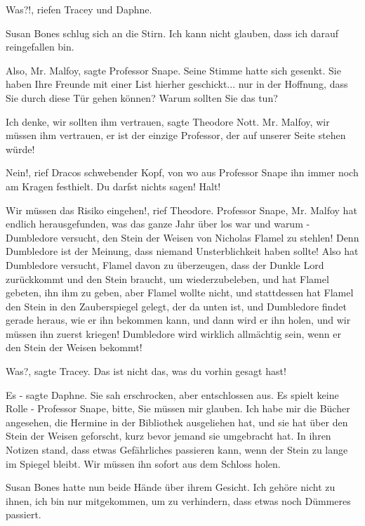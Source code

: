 \glqq{}Was?!\grqq{}, riefen Tracey und Daphne.

Susan Bones schlug sich an die Stirn. \glqq{}Ich kann nicht glauben, dass ich
darauf reingefallen bin.\grqq{}

\glqq{}Also, Mr. Malfoy\grqq{}, sagte Professor Snape. Seine Stimme hatte sich
gesenkt. \glqq{}Sie haben Ihre Freunde mit einer List hierher geschickt... nur in
der Hoffnung, dass Sie durch diese Tür gehen können? Warum sollten Sie das tun?\grqq{}

\glqq{}Ich denke, wir sollten ihm vertrauen\grqq{}, sagte Theodore Nott. \glqq{}
Mr. Malfoy, wir müssen ihm vertrauen, er ist der einzige Professor, der auf
unserer Seite stehen würde!\grqq{}

\glqq{}Nein!\grqq{}, rief Dracos schwebender Kopf, von wo aus Professor Snape ihn
immer noch am Kragen festhielt. \glqq{}Du darfst nichts sagen! Halt!\grqq{}

\glqq{}Wir müssen das Risiko eingehen!\grqq{}, rief Theodore. \glqq{}Professor
Snape, Mr. Malfoy hat endlich herausgefunden, was das ganze Jahr über los war
und warum - Dumbledore versucht, den Stein der Weisen von Nicholas Flamel zu
stehlen! Denn Dumbledore ist der Meinung, dass niemand Unsterblichkeit haben
sollte! Also hat Dumbledore versucht, Flamel davon zu überzeugen, dass der
Dunkle Lord zurückkommt und den Stein braucht, um wiederzubeleben, und hat
Flamel gebeten, ihn ihm zu geben, aber Flamel wollte nicht, und stattdessen hat
Flamel den Stein in den Zauberspiegel gelegt, der da unten ist, und Dumbledore
findet gerade heraus, wie er ihn bekommen kann, und dann wird er ihn holen, und
wir müssen ihn zuerst kriegen! Dumbledore wird wirklich allmächtig sein, wenn er
den Stein der Weisen bekommt!\grqq{}

\glqq{}Was?\grqq{}, sagte Tracey. \glqq{}Das ist nicht das, was du vorhin gesagt
hast!\grqq{}

\glqq{}Es -\grqq{} sagte Daphne. Sie sah erschrocken, aber entschlossen aus.
\glqq{}Es spielt keine Rolle - Professor Snape, bitte, Sie müssen mir glauben.
Ich habe mir die Bücher angesehen, die Hermine in der Bibliothek ausgeliehen
hat, und sie hat über den Stein der Weisen geforscht, kurz bevor jemand sie
umgebracht hat. In ihren Notizen stand, dass etwas Gefährliches passieren kann,
wenn der Stein zu lange im Spiegel bleibt. Wir müssen ihn sofort aus dem Schloss
holen.\grqq{}

Susan Bones hatte nun beide Hände über ihrem Gesicht. \glqq{}Ich gehöre nicht zu
ihnen, ich bin nur mitgekommen, um zu verhindern, dass etwas noch Dümmeres
passiert.\grqq{}

